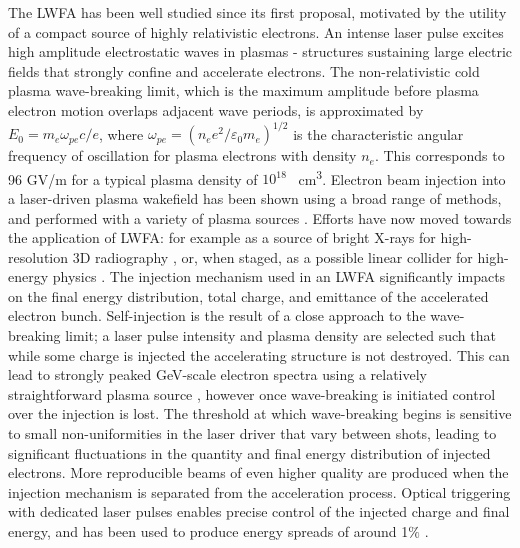 \documentclass[preprint,5p,times,sort&compress]{elsarticle}
\begin{document}
The LWFA \cite{Tajima1979} has been well studied since its first proposal, motivated by the utility of a compact source of highly relativistic electrons. An intense laser pulse excites high amplitude electrostatic waves in plasmas - structures sustaining large electric fields that strongly confine and accelerate electrons. The non-relativistic cold plasma wave-breaking limit, which is the maximum amplitude before plasma electron motion overlaps adjacent wave periods, is approximated by $E_0 = m_e \omega_{pe} c / e$, where $\omega_{pe} = (n_e e^2 / \varepsilon_0 m_e)^{1/2}$ is the characteristic angular frequency of oscillation for plasma electrons with density $n_e$. This corresponds to 96 GV/m for a typical plasma density of $10^{18}$ \si{\per\centi\meter\cubed}. Electron beam injection into a laser-driven plasma wakefield has been shown using a broad range of methods, and performed with a variety of plasma sources \cite{Esarey2009}. Efforts have now moved towards the application of LWFA: for example as a source of bright X-rays for high-resolution 3D radiography \cite{Wenz2015}, or, when staged, as a possible linear collider for high-energy physics \cite{Steinke2016}. The injection mechanism used in an LWFA significantly impacts on the final energy distribution, total charge, and emittance of the accelerated electron bunch. Self-injection is the result of a close approach to the wave-breaking limit; a laser pulse intensity and plasma density are selected such that while some charge is injected the accelerating structure is not destroyed. This can lead to strongly peaked GeV-scale electron spectra using a relatively straightforward plasma source \cite{Wang2013}, however once wave-breaking is initiated control over the injection is lost. The threshold at which wave-breaking begins is sensitive to small non-uniformities in the laser driver that vary between shots, leading to significant fluctuations in the quantity and final energy distribution of injected electrons. More reproducible beams of even higher quality are produced when the injection mechanism is separated from the acceleration process. Optical triggering with dedicated laser pulses enables precise control of the injected charge and final energy, and has been used to produce energy spreads of around 1$\%$ \cite{Faure2006}. 
\par
\end{document}
